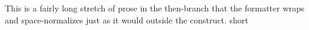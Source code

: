 \ifdraft
This is    a fairly long stretch of prose in the then-branch that the formatter wraps and space-normalizes just as it would outside the construct.
\else
short
\fi
